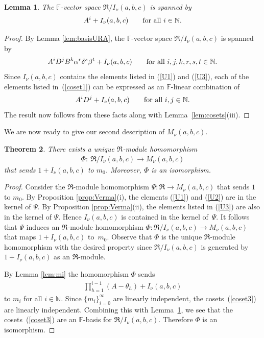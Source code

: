 \documentclass[11pt]{article}
\numberwithin{equation}{section}
\def\N{\mathbb N}
\def\F{\mathbb F}
\numberwithin{equation}{section}
\newtheorem{Theorem}{Theorem}[section]
\newtheorem{Lemma}[Theorem]{Lemma}
\begin{document}
\begin{Lemma}\label{lem:R/I_basis}The $\F$-vector space $\Re/I_\nu(a,b,c)$ is spanned by
\begin{gather*}
A^i+I_\nu(a,b,c) \qquad \hbox{for all $i\in \N$}.
\end{gather*}
\end{Lemma}
\begin{proof}By Lemma \ref{lem:basisURA}, the $\F$-vector space $\Re/I_\nu(a,b,c)$ is spanned by
\begin{gather}\label{coset1}
A^i D^j B^k \alpha^r \delta^s \beta^t+I_\nu(a,b,c)\qquad \hbox{for all $i,j,k,r,s,t\in \N$}.
\end{gather}
Since $I_\nu(a,b,c)$ contains the elements listed in (\ref{U1}) and (\ref{U3}), each of the elements listed in~(\ref{coset1}) can be expressed as an $\F$-linear combination of
\begin{gather*}%
A^i D^j+I_\nu(a,b,c) \qquad \hbox{for all $i,j\in \N$}.
\end{gather*}
The result now follows from these facts along with Lemma~\ref{lem:cosets}(iii).
\end{proof}

We are now ready to give our second description of $M_\nu(a,b,c)$.

\begin{Theorem}\label{thm:M=R/I}There exists a unique $\Re$-module homomorphism
\begin{gather*}
\Phi\colon \ \Re/I_\nu(a,b,c)\to M_\nu(a,b,c)
\end{gather*}
that sends $1+I_\nu(a,b,c)$ to $m_0$. Moreover, $\Phi$ is an isomorphism.
\end{Theorem}
\begin{proof}Consider the $\Re$-module homomorphism $\Psi\colon \Re\to M_\nu(a,b,c)$ that sends $1$ to $m_0$. By Proposition \ref{prop:Verma}(i), the elements (\ref{U1}) and (\ref{U2}) are in the kernel of $\Psi$. By Proposition \ref{prop:Verma}(ii), the elements listed in (\ref{U3}) are also in the kernel of $\Psi$. Hence $I_\nu(a,b,c)$ is contained in the kernel of~$\Psi$. It follows that $\Psi$ induces an $\Re$-module homomorphism $\Phi\colon \Re/I_\nu(a,b,c) \to M_\nu(a,b,c)$ that maps $1+I_\nu(a,b,c)$ to~$m_0$. Observe that $\Phi$ is the unique $\Re$-module homomorphism with the desired property since $\Re/I_\nu(a,b,c)$ is generated by $1+I_\nu(a,b,c)$ as an $\Re$-module.

By Lemma \ref{lem:mi} the homomorphism $\Phi$ sends
\begin{gather}\label{coset3}
\prod_{h=1}^{i-1}(A-\theta_h)+I_\nu(a,b,c)
\end{gather}
to $m_i$ for all $i\in \N$. Since $\{m_i\}_{i=0}^\infty$ are linearly independent, the cosets~(\ref{coset3}) are linearly independent. Combining this with Lemma~\ref{lem:R/I_basis}, we see that the cosets~(\ref{coset3}) are an $\F$-basis for $\Re/I_\nu(a,b,c)$. Therefore $\Phi$ is an isomorphism.
\end{proof}
\end{document}

